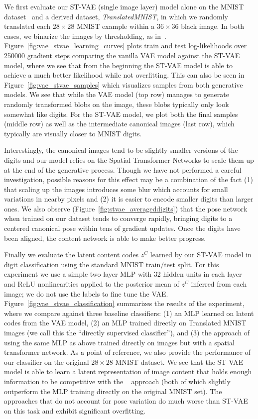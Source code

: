 We first evaluate our ST-VAE (single image layer) model alone on the MNIST dataset~\citep{lecun1998gradient}
and a derived dataset, \emph{TranslatedMNIST}, in which we randomly translated each  $28\times 28$ MNIST example
within a $36\times 36$ black image.  In both cases, we binarize the
images by thresholding,
as in~\cite{Kingma2014}.
Figure~\ref{fig:vae_stvae_learning_curves} plots train and test log-likelihoods over 250000 gradient steps
comparing the vanilla VAE model against the ST-VAE model, where we see that from the beginning the ST-VAE
model is able to achieve a much better likelihood while not overfitting.  This can also be seen in Figure~\ref{fig:vae_stvae_samples}
which visualizes samples from both generative models.   We see that while the VAE model (top row) manages to 
generate randomly transformed blobs on the image, these blobs typically only look somewhat like digits. 
For the ST-VAE model, we plot both the final samples (middle row) as well as the intermediate canonical images (last row), 
which typically are visually closer to MNIST digits. 

Interestingly, the canonical images tend to be slightly smaller versions
of the digits and our model relies on the Spatial Transformer Networks to scale them up at the end of the generative process.
Though we have not performed a careful investigation, 
possible reasons for this effect may be a combination of the fact (1) that scaling up the images introduces some blur which accounts for small variations in  nearby pixels and (2) it  is easier to encode smaller digits than larger ones.
 We also observe (Figure~\ref{fig:stvae_averageddigits})
that the pose network when trained on our dataset tends to converge rapidly, bringing digits to a centered canonical pose
within tens of gradient updates. 
Once the digits have been aligned, the content network is able to make better progress.

Finally we evaluate the latent content codes $z^C$ learned by our ST-VAE model 
in digit classification using the standard MNIST train/test split.  For this experiment
we use a simple two layer MLP with 32 hidden units in each layer and
ReLU nonlinearities
applied to the posterior mean of $z^C$ inferred from each image; we
do not use the labels to fine tune the VAE.
Figure~\ref{fig:vae_stvae_classification} summarizes the results of the experiment, where we
compare against three baseline classifiers: (1) an MLP learned on latent codes from the VAE model,
(2) an MLP trained directly on Translated MNIST images (we call this the ``directly supervised classifier''), 
and (3) the approach of~\cite{jaderberg2015spatial} using the same MLP as above trained directly
on images but with a spatial transformer network.
As a point of reference, we also provide the performance of our classifier on the original $28\times 28$ MNIST
dataset.  We see that the ST-VAE model is able to learn a latent representation of image content that holds enough information
to be competitive with the ~\cite{jaderberg2015spatial} approach (both of which slightly outperform 
the MLP training directly on the original MNIST set).  The approaches that do not account for
pose variation do much worse than ST-VAE on this task and exhibit significant overfitting.

